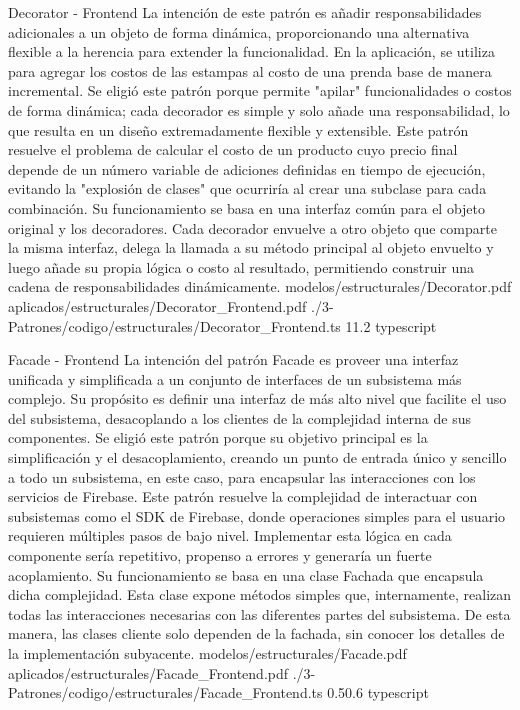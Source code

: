 \Patron
    {Decorator - Frontend}
    {La intención de este patrón es añadir responsabilidades adicionales a un objeto de forma dinámica, proporcionando una alternativa flexible a la herencia para extender la funcionalidad. En la aplicación, se utiliza para agregar los costos de las estampas al costo de una prenda base de manera incremental. Se eligió este patrón porque permite "apilar" funcionalidades o costos de forma dinámica; cada decorador es simple y solo añade una responsabilidad, lo que resulta en un diseño extremadamente flexible y extensible.}
    {Este patrón resuelve el problema de calcular el costo de un producto cuyo precio final depende de un número variable de adiciones definidas en tiempo de ejecución, evitando la "explosión de clases" que ocurriría al crear una subclase para cada combinación. Su funcionamiento se basa en una interfaz común para el objeto original y los decoradores. Cada decorador envuelve a otro objeto que comparte la misma interfaz, delega la llamada a su método principal al objeto envuelto y luego añade su propia lógica o costo al resultado, permitiendo construir una cadena de responsabilidades dinámicamente.}
    {modelos/estructurales/Decorator.pdf}
    {aplicados/estructurales/Decorator_Frontend.pdf}
    {./3-Patrones/codigo/estructurales/Decorator_Frontend.ts}
    {1}{1.2}
    {typescript}
\newpage

\Patron
    {Facade - Frontend}
    {La intención del patrón Facade es proveer una interfaz unificada y simplificada a un conjunto de interfaces de un subsistema más complejo. Su propósito es definir una interfaz de más alto nivel que facilite el uso del subsistema, desacoplando a los clientes de la complejidad interna de sus componentes. Se eligió este patrón porque su objetivo principal es la simplificación y el desacoplamiento, creando un punto de entrada único y sencillo a todo un subsistema, en este caso, para encapsular las interacciones con los servicios de Firebase.}
    {Este patrón resuelve la complejidad de interactuar con subsistemas como el SDK de Firebase, donde operaciones simples para el usuario requieren múltiples pasos de bajo nivel. Implementar esta lógica en cada componente sería repetitivo, propenso a errores y generaría un fuerte acoplamiento. Su funcionamiento se basa en una clase Fachada que encapsula dicha complejidad. Esta clase expone métodos simples que, internamente, realizan todas las interacciones necesarias con las diferentes partes del subsistema. De esta manera, las clases cliente solo dependen de la fachada, sin conocer los detalles de la implementación subyacente.}
    {modelos/estructurales/Facade.pdf}
    {aplicados/estructurales/Facade_Frontend.pdf}
    {./3-Patrones/codigo/estructurales/Facade_Frontend.ts}
    {0.5}{0.6}
    {typescript}
\newpage


